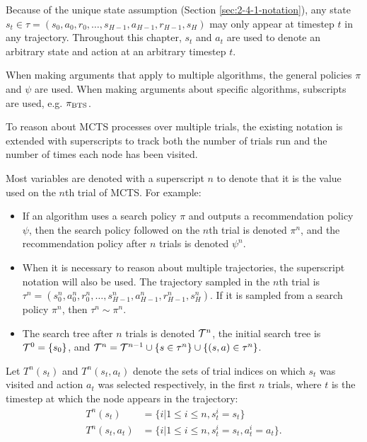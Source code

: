     Because of the unique state assumption (Section \ref{sec:2-4-1-notation}), any state $s_t \in \tau = (s_0,a_0,r_0,\ldots,s_{H-1},a_{H-1},r_{H-1},s_{H})$ may only appear at timestep $t$ in any trajectory. Throughout this chapter, $s_t$ and $a_t$ are used to denote an arbitrary state and action at an arbitrary timestep $t$.

    When making arguments that apply to multiple algorithms, the general policies $\pi$ and $\psi$ are used. When making arguments about specific algorithms, subscripts are used, e.g. ${\pi_{{\textnormal{BTS}}}}$. 

    To reason about MCTS processes over multiple trials, the existing notation is extended with superscripts to track both the number of trials run and the number of times each node has been visited.

    Most variables are denoted with a superscript $n$ to denote that it is the value used on the $n$th trial of MCTS. For example:
    \begin{itemize}
        \item 
            If an algorithm uses a search policy $\pi$ and outputs a recommendation policy $\psi$, then the search policy followed on the $n$th trial is denoted $\pi^n$, and the recommendation policy after $n$ trials is denoted $\psi^n$. 
        \item 
            When it is necessary to reason about multiple trajectories, the superscript notation will also be used. The trajectory sampled in the $n$th trial is $\tau^n=(s_0^n,a_0^n,r_0^n,\ldots,s_{H-1}^n,a_{H-1}^n,r_{H-1}^n,s_{H}^n)$. If it is sampled from a search policy $\pi^n$, then $\tau^n\sim\pi^n$.
        \item 
            The search tree after $n$ trials is denoted $\mathcal{T}^n$, the initial search tree is $\mathcal{T}^0=\{s_0\}$, and $\mathcal{T}^n = \mathcal{T}^{n-1} \cup \{s\in\tau^n\} \cup \{(s,a)\in\tau^n\}$.
    \end{itemize}

    Let $T^n(s_t)$ and $T^n(s_t,a_t)$ denote the sets of trial indices on which $s_t$ was visited and action $a_t$ was selected respectively, in the first $n$ trials, where $t$ is the timestep at which the node appears in the trajectory:
    \begin{align}
        T^n(s_t) &= \{i | 1\leq i\leq n, s^i_t = s_t \} \label{eq:4:index_set_s} \\
        T^n(s_t,a_t) &= \{i | 1\leq i\leq n, s^i_t = s_t, a^i_t = a_t \} \label{eq:4:index_set_sa}.
    \end{align}

